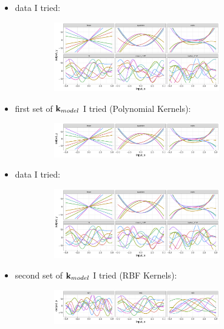 \documentclass{beamer}
\begin{document}
\begin{frame}  
\begin{itemize}
\item data I tried:
\begin{center}
 \includegraphics[height=3cm, width=10.6cm]{./plot/data_plot} 
\end{center}
\item first set of ${\bf k}_{model}$ I tried (Polynomial Kernels):
\begin{center}
 \includegraphics[height=1.5cm, width=10.6cm]{./plot/poly_lib} 
\end{center}
\end{itemize}
\end{frame}

\begin{frame}  
\begin{itemize}
\item data I tried:
\begin{center}
 \includegraphics[height=3cm, width=10.6cm]{./plot/data_plot} 
\end{center}
\item second set of ${\bf k}_{model}$ I tried (RBF Kernels):
\begin{center}
 \includegraphics[height=1.5cm, width=10.6cm]{./plot/rbf_lib} 
\end{center}
\end{itemize}
\end{frame}
\end{document}
